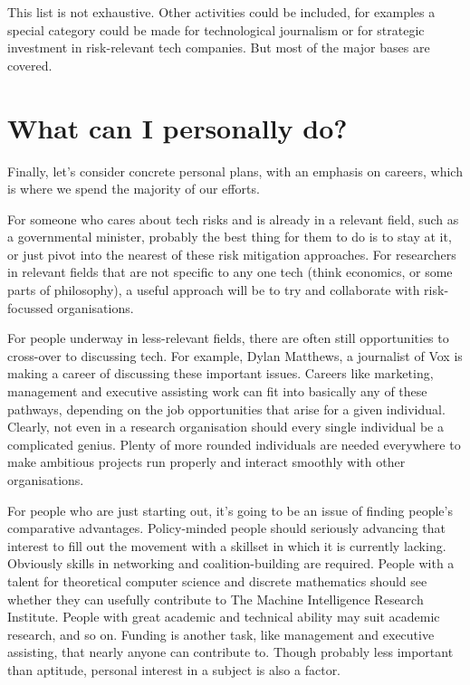﻿\documentclass[12pt]{article}
\begin{document}
This list is not exhaustive. Other activities could be included, for examples a special category could be made for technological journalism or for strategic investment in risk-relevant tech companies. But most of the major bases are covered.

\section{What can I personally do?}
Finally, let's consider concrete personal plans, with an emphasis on careers, which is where we spend the majority 
of our efforts.

For someone who cares about tech risks and is already in a relevant field, such as a governmental minister, 
probably the best thing for them to do is to stay at it, or just pivot into the nearest of these risk mitigation 
approaches. For researchers in relevant fields that are not specific to any one tech (think economics, or some 
parts of philosophy), a useful approach will be to try and collaborate with risk-focussed organisations.

For people underway in less-relevant fields, there are often still opportunities to cross-over to discussing tech. 
For example, Dylan Matthews, a journalist of Vox is making a career of discussing these important issues. Careers 
like marketing, management and executive assisting work can fit into basically any of these pathways, depending 
on the job opportunities that arise for a given individual. Clearly, not even in a research organisation should 
every single individual be a complicated genius. Plenty of more rounded individuals are needed everywhere to 
make ambitious projects run properly and interact smoothly with other organisations.

For people who are just starting out, it's going to be an issue of finding people's comparative advantages. 
Policy-minded people should seriously advancing that interest to fill out the movement with a skillset in 
which it is currently lacking. Obviously skills in networking and coalition-building are 
required. People with a talent for theoretical computer science and discrete mathematics 
should see whether they can usefully contribute to The Machine Intelligence Research 
Institute. People with great academic and technical ability may suit academic research, 
and so on. Funding is another task, like management and executive assisting, 
that nearly anyone can contribute to. Though probably less important than aptitude, personal 
interest in a subject is also a factor.
\end{document}

